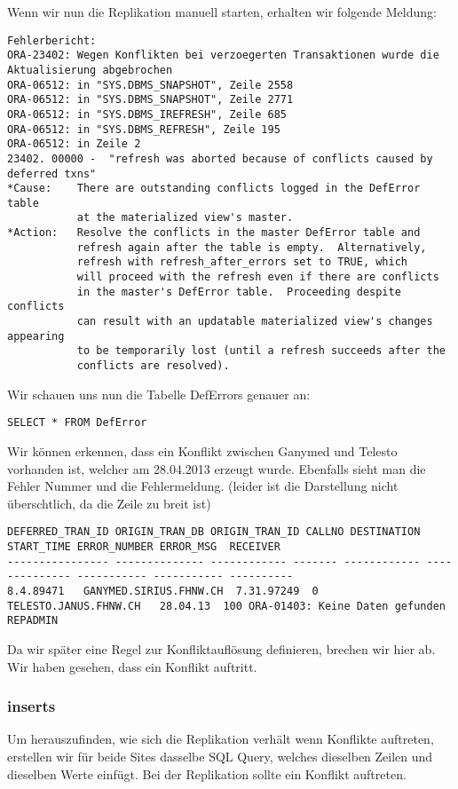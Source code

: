 \documentclass[11pt,a4paper,parskip=half]{scrartcl}
\begin{document}
Wenn wir nun die Replikation manuell starten, erhalten wir folgende Meldung:
\begin{lstlisting}
Fehlerbericht:
ORA-23402: Wegen Konflikten bei verzoegerten Transaktionen wurde die Aktualisierung abgebrochen
ORA-06512: in "SYS.DBMS_SNAPSHOT", Zeile 2558
ORA-06512: in "SYS.DBMS_SNAPSHOT", Zeile 2771
ORA-06512: in "SYS.DBMS_IREFRESH", Zeile 685
ORA-06512: in "SYS.DBMS_REFRESH", Zeile 195
ORA-06512: in Zeile 2
23402. 00000 -  "refresh was aborted because of conflicts caused by deferred txns"
*Cause:    There are outstanding conflicts logged in the DefError table
           at the materialized view's master.
*Action:   Resolve the conflicts in the master DefError table and
           refresh again after the table is empty.  Alternatively,
           refresh with refresh_after_errors set to TRUE, which
           will proceed with the refresh even if there are conflicts
           in the master's DefError table.  Proceeding despite conflicts
           can result with an updatable materialized view's changes appearing
           to be temporarily lost (until a refresh succeeds after the
           conflicts are resolved).
\end{lstlisting}

Wir schauen uns nun die Tabelle DefErrors genauer an:
\begin{lstlisting}
SELECT * FROM DefError
\end{lstlisting}

Wir können erkennen, dass ein Konflikt zwischen Ganymed und Telesto vorhanden ist, welcher am 28.04.2013 erzeugt wurde. Ebenfalls sieht man die Fehler Nummer und die Fehlermeldung. (leider ist die Darstellung nicht überschtlich, da die Zeile zu breit ist)
\begin{lstlisting}
DEFERRED_TRAN_ID ORIGIN_TRAN_DB ORIGIN_TRAN_ID CALLNO DESTINATION START_TIME ERROR_NUMBER ERROR_MSG  RECEIVER
---------------- -------------- ------------ ------- ------------ -------------- ----------- ----------- ----------
8.4.89471   GANYMED.SIRIUS.FHNW.CH  7.31.97249  0 TELESTO.JANUS.FHNW.CH   28.04.13  100 ORA-01403: Keine Daten gefunden  REPADMIN
\end{lstlisting}

Da wir später eine Regel zur Konfliktauflösung definieren, brechen wir hier ab. Wir haben gesehen, dass ein Konflikt auftritt.
\subsubsection{inserts}
Um herauszufinden, wie sich die Replikation verhält wenn Konflikte auftreten, erstellen wir für beide Sites dasselbe SQL Query, welches dieselben Zeilen und dieselben Werte einfügt. Bei der Replikation sollte ein Konflikt auftreten.
\end{document}
